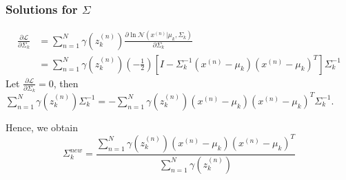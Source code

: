\documentclass{article}
\begin{document}
\begin{spacing}{1.5}
\subsubsection{Solutions for $\Sigma$}
\begin{equation}
\begin{aligned}
\frac{\partial \mathcal{L}}{\partial \Sigma_k} &= \sum_{n=1}^N \gamma (z^{(n)}_k)\frac{\partial \ln \mathcal{N}(x^{(n)}|\mu_k, \Sigma_k)}{\partial \Sigma_k} \\
&= \sum_{n=1}^N \gamma (z^{(n)}_k) (-\frac{1}{2})[I - \Sigma_k^{-1}(x^{(n)}-\mu_k)(x^{(n)}-\mu_k)^T] \Sigma_k^{-1}
\end{aligned}
\end{equation}
Let $\frac{\partial \mathcal{L}}{\partial \Sigma_k}=0$, then $\sum_{n=1}^N \gamma (z^{(n)}_k)\Sigma_k^{-1}= - \sum_{n=1}^N \gamma (z^{(n)}_k)(x^{(n)}-\mu_k)(x^{(n)}-\mu_k)^T \Sigma_k^{-1}$.

Hence, we obtain
\begin{equation}
\Sigma_k^{new} = \frac{\sum_{n=1}^N \gamma (z^{(n)}_k) (x^{(n)}-\mu_k)(x^{(n)}-\mu_k)^T}{\sum_{n=1}^N \gamma (z^{(n)}_k)}
\end{equation}


\end{spacing}
\end{document}
